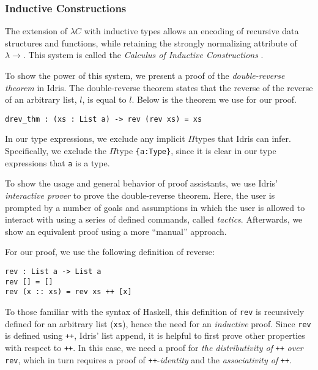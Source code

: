 \documentclass[9pt,preprint,nocopyrightspace,computermodern]{sigplanconf} %
\begin{document}
\subsubsection*{Inductive Constructions}
The extension of \(\lambda C\) with inductive types allows an encoding of recursive
data structures and functions, while retaining the strongly normalizing attribute of
\(\lambda\!\!\rightarrow\). This system is called the
\textit{Calculus of Inductive Constructions} \cite{bert}.

To show the power of this system, we present a proof of the \textit{double-reverse theorem}
in Idris. The double-reverse theorem states that the reverse of the reverse of
an arbitrary list, \(l\), is equal to \(l\). Below is the theorem we use for our proof.

{\small
\begin{verbatim}
drev_thm : (xs : List a) -> rev (rev xs) = xs
\end{verbatim}
}

In our type expressions, we exclude any implicit \(\Pi\)types that Idris can infer.
Specifically, we exclude the \(\Pi\)type {\small\tt \{a:Type\}}, since it is
clear in our type expressions that {\small\tt a} is a type.

To show the usage and general behavior of proof assistants, we use Idris'
\textit{interactive prover} to prove the double-reverse theorem. Here, the user is
prompted by a number of goals and assumptions in which the user is allowed to
interact with using a series of defined commands, called \textit{tactics}.
Afterwards, we show an equivalent proof using a more ``manual'' approach.

For our proof, we use the following definition of reverse:

{\small
\begin{verbatim}
rev : List a -> List a
rev [] = []
rev (x :: xs) = rev xs ++ [x]
\end{verbatim}}

To those familiar with the syntax of Haskell, this definition of {\small\tt rev}
is recursively defined for an arbitrary list ({\small\tt xs}), hence the need
for an \textit{inductive} proof. Since {\small\tt rev} is defined using
{\small\tt ++}, Idris' list append, it is helpful to first prove other properties
with respect to {\small\tt ++}. In this case, we need a proof for
\textit{the distributivity of} {\small\tt ++} \textit{over} {\small\tt rev},
which in turn requires a proof of {\small\tt ++}-\textit{identity} and the
\textit{associativity of} {\small\tt ++}.
\end{document}
